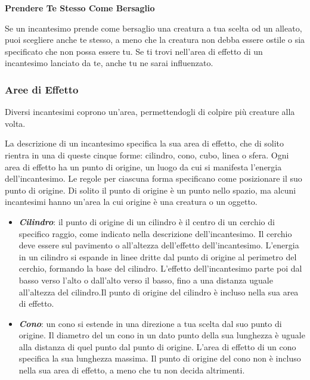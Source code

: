 \documentclass[12pt,a4paper,twoside,openany]{book}
\begin{document}
\begin{multicols}{2}
\textbf{Prendere Te Stesso Come Bersaglio}

Se un incantesimo prende come bersaglio una creatura a tua scelta od un alleato, puoi scegliere anche te stesso, a meno che la creatura non debba essere ostile o sia specificato che non possa essere tu. Se ti trovi nell'area di effetto di un incantesimo lanciato da te, anche tu ne sarai influenzato.

%

\subsubsection{Aree di Effetto}\label{magieareedieffetto}

Diversi incantesimi coprono un'area, permettendogli di colpire più creature alla volta.

La descrizione di un incantesimo specifica la sua area di effetto, che di solito rientra in una di queste cinque forme: cilindro, cono, cubo, linea o sfera. Ogni area di effetto ha un punto di origine, un luogo da cui si manifesta l'energia dell'incantesimo. Le regole per ciascuna forma specificano come posizionare il suo punto di origine. Di solito il punto di origine è un punto nello spazio, ma alcuni incantesimi hanno un'area la cui origine è una creatura o un oggetto.

\begin{itemize}
\item
\textit{\textbf{Cilindro}}: il punto di origine di un cilindro è il centro di un cerchio di specifico raggio, come indicato nella descrizione dell'incantesimo. Il cerchio deve essere sul pavimento o all'altezza dell'effetto dell'incantesimo. L'energia in un cilindro si espande in linee dritte dal punto di origine al perimetro del cerchio, formando la base del cilindro. L'effetto dell'incantesimo parte poi dal basso verso l'alto o dall'alto verso il basso, fino a una distanza uguale all'altezza del cilindro.Il punto di origine del cilindro è incluso nella sua area di effetto.
	
\item
\textit{\textbf{Cono}}: un cono si estende in una direzione a tua scelta dal suo punto di origine. Il diametro del un cono in un dato punto della sua lunghezza è uguale alla distanza di quel punto dal punto di origine. L'area di effetto di un cono specifica la sua lunghezza massima. Il punto di origine del cono non è incluso nella sua area di effetto, a meno che tu non decida altrimenti.
	

\end{itemize}
\end{multicols}
\end{document}
